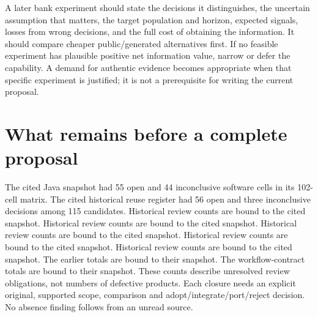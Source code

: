 A later bank experiment should state the decisions it distinguishes, the
uncertain assumption that matters, the target population and horizon,
expected signals, losses from wrong decisions, and the full cost of
obtaining the information. It should compare cheaper public/generated
alternatives first. If no feasible experiment has plausible positive net
information value, narrow or defer the capability. A demand for
authentic evidence becomes appropriate when that specific experiment is
justified; it is not a prerequisite for writing the current proposal.

\hypertarget{what-remains-before-a-complete-proposal}{%
\section{What remains before a complete
proposal}\label{what-remains-before-a-complete-proposal}}

The cited Java snapshot had 55 open and 44 inconclusive software cells
in its 102-cell matrix. \citep{sp24longjava_progress} The cited
historical reuse register had 56 open and three inconclusive decisions
among 115 candidates. Historical review counts are bound to the cited
snapshot. \citep{sp23tg_progress} Historical review counts are bound to
the cited snapshot. \citep{sp23panel_progress} Historical review counts
are bound to the cited snapshot. \citep{sp23otheriv_progress} Historical
review counts are bound to the cited snapshot.
\citep{sp23admission_progress} Historical review counts are bound to the
cited snapshot. \citep{sp23proof_progress} The earlier totals are bound
to their snapshot. \citep{sp24longpy_progress} The workflow-contract
totals are bound to their snapshot.
\citep{sp24workflowcontracts_progress} These counts describe unresolved
review obligations, not numbers of defective products. Each closure
needs an explicit original, supported scope, comparison and
adopt/integrate/port/reject decision. No absence finding follows from an
unread source.
\citep{sp23nt_progress,sp23lt_progress,sp23dw_progress,sp23sm_progress,sp22wf_progress,sp22ft_progress,sp22si_progress,sp22ob_progress,sp22dk_progress,sp22iv_progress,sp22bs_progress,sp21rr_progress,sp21pr_progress,sp21gs_progress,sp21eo_progress,sp21tr_progress,sp21ae_progress,sp21gr_progress,sp21ck_progress,sp21cx_progress,sp20md_progress,sp20gf_progress,sp20hy_progress,sp20je_progress,sp20nc_progress,sp20gc_progress,sp20ea_progress,sp20vm_progress,sp20pye_progress,sp20fx_progress,sp20pa_progress,sp20rfx_progress}

